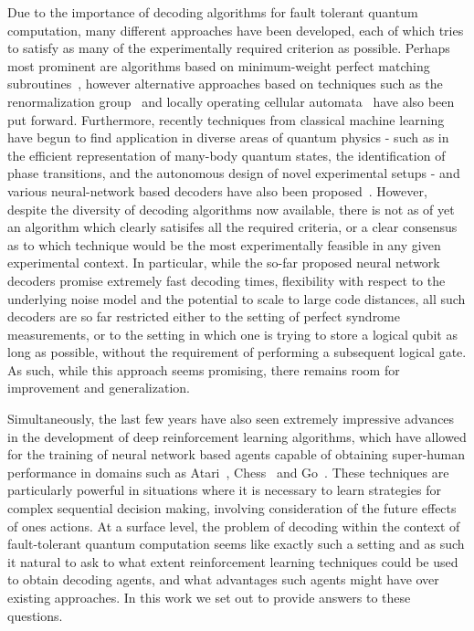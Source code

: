 \documentclass[twocolumn,preprintnumbers,amsmath,amssymb,notitlepage,nofootinbib,longbibliography,superscriptaddress,aps,pra,10pt]{revtex4-1}
\begin{document}
	Due to the importance of decoding algorithms for fault tolerant quantum computation, many different approaches have been developed, each of which tries to satisfy as many of the experimentally required criterion as possible.
	Perhaps most prominent are algorithms based on minimum-weight perfect matching subroutines~\cite{Fowler13}, however alternative approaches based on techniques such as the renormalization group~\cite{Duclos2010} and locally operating cellular automata~\cite{Herold15} have also been put forward.
	Furthermore, recently techniques from classical machine learning have begun to find application in diverse areas of quantum physics - such as in the efficient representation of many-body quantum states, the identification of phase transitions, and the autonomous design of novel experimental setups - and various neural-network based decoders have also been proposed~\cite{Torlai10, Varsamopoulos17, Krastanov17, Breuckmann18, Baireuther18a, Baireuther18b, Ni18}.
	However, despite the diversity of decoding algorithms now available, there is not as of yet an algorithm which clearly satisifes all the required criteria, or a clear consensus as to which technique would be the most experimentally feasible in any given experimental context.
	In particular, while the so-far proposed neural network decoders promise extremely fast decoding times, flexibility with respect to the underlying noise model and the potential to scale to large code distances, all such decoders are so far restricted either to the setting of perfect syndrome measurements, or to the setting in which one is trying to store a logical qubit as long as possible, without the requirement of performing a subsequent logical gate.
	As such, while this approach seems promising, there remains room for improvement and generalization.

	Simultaneously, the last few years have also seen extremely impressive advances in the development of deep reinforcement learning algorithms, which have allowed for the training of neural network based agents capable of obtaining super-human performance in domains such as Atari~\cite{Mnih15}, Chess~\cite{Silver17a} and Go~\cite{Silver17b}.
	These techniques are particularly powerful in situations where it is necessary to learn strategies for complex sequential decision making, involving consideration of the future effects of ones actions.
	At a surface level, the problem of decoding within the context of fault-tolerant quantum computation seems like exactly such a setting and as such it natural to ask to what extent reinforcement learning techniques could be used to obtain decoding agents, and what advantages such agents might have over existing approaches.
	In this work we set out to provide answers to these questions.
\end{document}
